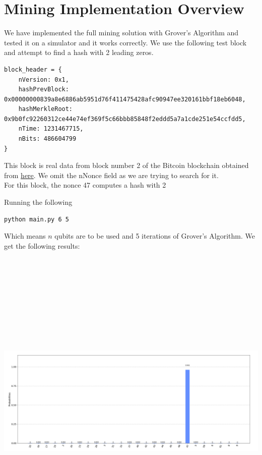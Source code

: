 \documentclass[11pt]{article} %
\begin{document}
\section{Mining Implementation Overview}{}
We have implemented the full mining solution with Grover's Algorithm and tested it on a simulator and it works correctly. We use the following test block and attempt to find a hash with 2 leading zeros.

\begin{verbatim}
block_header = {
    nVersion: 0x1,
    hashPrevBlock: 0x00000000839a8e6886ab5951d76f411475428afc90947ee320161bbf18eb6048,
    hashMerkleRoot: 0x9b0fc92260312ce44e74ef369f5c66bbb85848f2eddd5a7a1cde251e54ccfdd5,
    nTime: 1231467715,
    nBits: 486604799
}
\end{verbatim}

\noindent This block is real data from block number 2 of the Bitcoin blockchain obtained from \href{https://www.blockchain.com/btc/block/2}{here}. We omit the nNonce field as we are trying to search for it.\\

\noindent For this block, the nonce 47 computes a hash with 2

\noindent Running the following

\begin{verbatim}
python main.py 6 5
\end{verbatim}

Which means $n$ qubits are to be used and 5 iterations of Grover's Algorithm. We get the following results:

\includegraphics[keepaspectratio, width=15cm, height=15cm]{plot}
\end{document}

